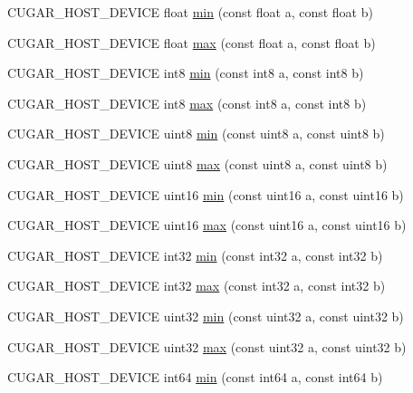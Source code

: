 \begin{DoxyCompactItemize}
\item 
C\+U\+G\+A\+R\+\_\+\+H\+O\+S\+T\+\_\+\+D\+E\+V\+I\+CE float \hyperlink{group___basic_ga7359b06cac70a9ebdc0cec435a22dc78}{min} (const float a, const float b)
\item 
C\+U\+G\+A\+R\+\_\+\+H\+O\+S\+T\+\_\+\+D\+E\+V\+I\+CE float \hyperlink{group___basic_gacf2a4854f407fd49acbe6de7dd955fb1}{max} (const float a, const float b)
\item 
C\+U\+G\+A\+R\+\_\+\+H\+O\+S\+T\+\_\+\+D\+E\+V\+I\+CE int8 \hyperlink{group___basic_gac9bd069f8fb579f27655344e2a8eaafe}{min} (const int8 a, const int8 b)
\item 
C\+U\+G\+A\+R\+\_\+\+H\+O\+S\+T\+\_\+\+D\+E\+V\+I\+CE int8 \hyperlink{group___basic_ga4064b22dd9157ceb1c2bcdbfdad13fbd}{max} (const int8 a, const int8 b)
\item 
C\+U\+G\+A\+R\+\_\+\+H\+O\+S\+T\+\_\+\+D\+E\+V\+I\+CE uint8 \hyperlink{group___basic_ga07e60716a77447bddef733b3c77838a7}{min} (const uint8 a, const uint8 b)
\item 
C\+U\+G\+A\+R\+\_\+\+H\+O\+S\+T\+\_\+\+D\+E\+V\+I\+CE uint8 \hyperlink{group___basic_gafe1b5e565ab031c6a2fe4430777e0d64}{max} (const uint8 a, const uint8 b)
\item 
C\+U\+G\+A\+R\+\_\+\+H\+O\+S\+T\+\_\+\+D\+E\+V\+I\+CE uint16 \hyperlink{group___basic_gadac4763807d3e84119b991def668b96a}{min} (const uint16 a, const uint16 b)
\item 
C\+U\+G\+A\+R\+\_\+\+H\+O\+S\+T\+\_\+\+D\+E\+V\+I\+CE uint16 \hyperlink{group___basic_gad7f98145cf912b8c66a7675cd9cb5e18}{max} (const uint16 a, const uint16 b)
\item 
C\+U\+G\+A\+R\+\_\+\+H\+O\+S\+T\+\_\+\+D\+E\+V\+I\+CE int32 \hyperlink{group___basic_gac0bc43a4d8949143dc20b3116d5065e7}{min} (const int32 a, const int32 b)
\item 
C\+U\+G\+A\+R\+\_\+\+H\+O\+S\+T\+\_\+\+D\+E\+V\+I\+CE int32 \hyperlink{group___basic_ga4973552119d9d62f4c9db07d08dbc3d6}{max} (const int32 a, const int32 b)
\item 
C\+U\+G\+A\+R\+\_\+\+H\+O\+S\+T\+\_\+\+D\+E\+V\+I\+CE uint32 \hyperlink{group___basic_ga4b5fa5961733ee2ad393a6c581d07c5d}{min} (const uint32 a, const uint32 b)
\item 
C\+U\+G\+A\+R\+\_\+\+H\+O\+S\+T\+\_\+\+D\+E\+V\+I\+CE uint32 \hyperlink{group___basic_gaabae3013fbdf1d86ce652f218a7f2bb2}{max} (const uint32 a, const uint32 b)
\item 
C\+U\+G\+A\+R\+\_\+\+H\+O\+S\+T\+\_\+\+D\+E\+V\+I\+CE int64 \hyperlink{group___basic_ga3914d3facba77353216fbd68e3df1dac}{min} (const int64 a, const int64 b)

\end{DoxyCompactItemize}
